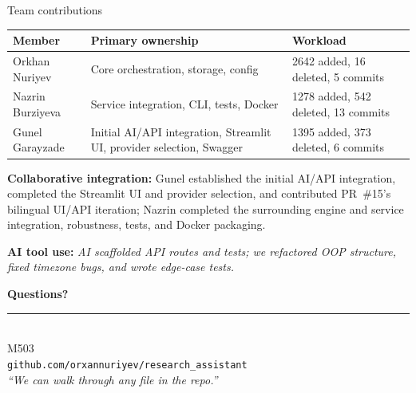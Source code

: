 \documentclass[aspectratio=169,11pt]{beamer}
\newcommand{\teamname}{M503}
\newcommand{\repolink}{github.com/orxannuriyev/research\_assistant}
\begin{document}
\begin{frame}{Team contributions}
  \begin{center}\small
  \begin{tabularx}{\linewidth}{lXl}
    \toprule
    \textbf{Member} & \textbf{Primary ownership} & \textbf{Workload} \\
    \midrule
    Orkhan Nuriyev   & Core orchestration, storage, config   & 2642 added, 16 deleted, 5 commits \\
    Nazrin Burziyeva & Service integration, CLI, tests, Docker & 1278 added, 542 deleted, 13 commits \\
    Gunel Garayzade  & Initial AI/API integration, Streamlit UI, provider selection, Swagger & 1395 added, 373 deleted, 6 commits \\
    \bottomrule
  \end{tabularx}
  \end{center}

  \vspace{0.4em}
  \textbf{Collaborative integration:} Gunel established the initial AI/API integration, completed the Streamlit UI and provider selection, and contributed PR~\#15's bilingual UI/API iteration; Nazrin completed the surrounding engine and service integration, robustness, tests, and Docker packaging.

  \vspace{0.4em}
  \textbf{AI tool use:} \textit{AI scaffolded API routes and tests; we refactored OOP structure, fixed timezone bugs, and wrote edge-case tests.}
\end{frame}

{%
\begin{frame}[plain]
  \begin{center}
    \vspace{1cm}
    {\Huge\bfseries\color{accent} Questions?}\\[1.2em]
    \rule{0.5\textwidth}{0.6pt}\\[1.2em]
    {\large \teamname}\\[0.6em]
    {\normalsize \texttt{\repolink}}\\[1cm]
    {\footnotesize\itshape ``We can walk through any file in the repo.''}
  \end{center}
\end{frame}
}
\end{document}
